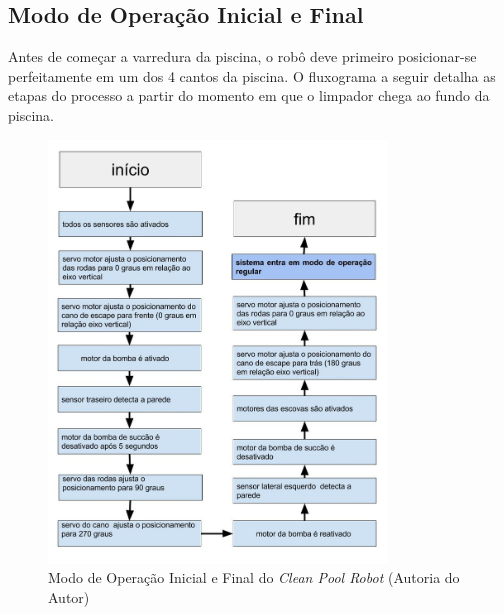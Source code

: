 \subsection{Modo de Operação Inicial e Final}
Antes de começar a varredura da piscina, o robô deve primeiro posicionar-se
perfeitamente em um dos 4 cantos da piscina. O fluxograma a seguir detalha
as etapas do processo a partir do momento em que o limpador chega ao fundo
da piscina.
\par
\begin{figure}[h]
  \centering
  \includegraphics[width=0.8\textwidth]{figures/flow-initial-robot.jpg}
  \caption{Modo de Operação Inicial e Final do \textit{Clean Pool Robot} (\textsf{Autoria do Autor})}
  \label{fig:flow-initial-robot}
\end{figure}
\FloatBarrier

